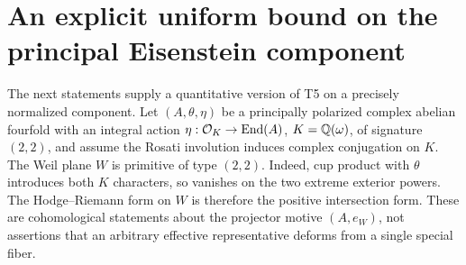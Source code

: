 \section{An explicit uniform bound on the principal Eisenstein component}
\label{sec:explicit-family}

The next statements supply a quantitative version of T5 on a precisely
normalized component. Let $(A,\theta,\eta)$ be a principally polarized
complex abelian fourfold with an integral action
$\eta:\mathcal O_K\to\operatorname{End}(A)$, $K=\mathbb Q(\omega)$, of signature $(2,2)$,
and assume the Rosati involution induces complex conjugation on $K$.
The Weil plane $W$ is primitive of type $(2,2)$. Indeed, cup product with
$\theta$ introduces both $K$ characters, so vanishes on the two extreme
exterior powers. The Hodge--Riemann form on $W$ is therefore the positive
intersection form. These are cohomological statements about the projector
motive $(A,e_W)$, not assertions that an arbitrary effective representative
deforms from a single special fiber.

